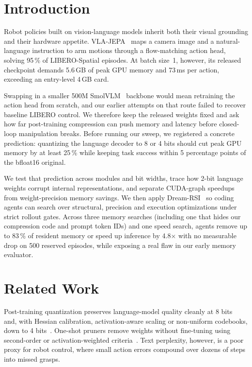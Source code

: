 \documentclass[conference]{IEEEtran}
\begin{document}
\section{Introduction}
\label{sec:intro}
Robot policies built on vision-language models inherit both their visual grounding and their
hardware appetite. VLA-JEPA~\cite{vlajepa} maps a camera image and a natural-language instruction to
arm motions through a flow-matching action head, solving 95\,\% of LIBERO-Spatial episodes. At
batch size~1, however, its released checkpoint demands 5.6\,GB of peak GPU memory and 73\,ms per
action, exceeding an entry-level 4\,GB card.

Swapping in a smaller 500M SmolVLM~\cite{smolvlm} backbone would mean retraining the action head
from scratch, and our earlier attempts on that route failed to recover baseline LIBERO control. We
therefore keep the released weights fixed and ask how far post-training compression can push memory
and latency before closed-loop manipulation breaks. Before running our sweep, we registered a
concrete prediction: quantizing the language decoder to 8 or 4 bits should cut peak GPU memory by
at least 25\,\% while keeping task success within 5 percentage points of the bfloat16 original.

We test that prediction across modules and bit widths, trace how 2-bit language weights corrupt
internal representations, and separate CUDA-graph speedups from weight-precision memory savings. We
then apply Dream-RSI~\cite{dreamrsi} so coding agents can search over structural, precision and
execution optimizations under strict rollout gates. Across three memory searches (including one
that hides our compression code and prompt token IDs) and one speed search, agents remove up to
83\,\% of resident memory or speed up inference by 4.8$\times$ with no measurable drop on 500
reserved episodes, while exposing a real flaw in our early memory evaluator.

\section{Related Work}
\label{sec:related}
Post-training quantization preserves language-model quality cleanly at 8 bits~\cite{llmint8} and,
with Hessian calibration, activation-aware scaling or non-uniform codebooks, down to 4
bits~\cite{gptq,awq,qlora,hqq}. One-shot pruners remove weights without fine-tuning using
second-order or activation-weighted criteria~\cite{sparsegpt,wanda}. Text perplexity, however, is a
poor proxy for robot control, where small action errors compound over dozens of steps into missed
grasps.
\end{document}

